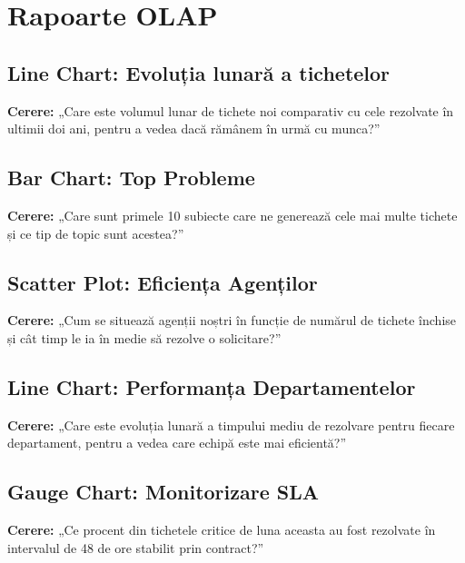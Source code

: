 \chapter{Rapoarte OLAP}
\label{sec:rapoarte}

\section{Line Chart: Evoluția lunară a tichetelor}
\textbf{Cerere:} „Care este volumul lunar de tichete noi comparativ cu cele rezolvate în ultimii doi ani, pentru a vedea dacă rămânem în urmă cu munca?”

\section{Bar Chart: Top Probleme}
\textbf{Cerere:} „Care sunt primele 10 subiecte care ne generează cele mai multe tichete și ce tip de topic sunt acestea?”

\section{Scatter Plot: Eficiența Agenților}
\textbf{Cerere:} „Cum se situează agenții noștri în funcție de numărul de tichete închise și cât timp le ia în medie să rezolve o solicitare?”

\section{Line Chart: Performanța Departamentelor}
\textbf{Cerere:} „Care este evoluția lunară a timpului mediu de rezolvare pentru fiecare departament, pentru a vedea care echipă este mai eficientă?”

\section{Gauge Chart: Monitorizare SLA}
\textbf{Cerere:} „Ce procent din tichetele critice de luna aceasta au fost rezolvate în intervalul de 48 de ore stabilit prin contract?”
